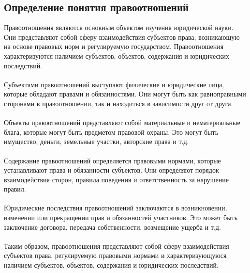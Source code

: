 \documentclass{article}
\begin{document}
\subsection{Определение понятия правоотношений}
Правоотношения являются основным объектом изучения юридической науки. Они представляют собой сферу взаимодействия субъектов права, возникающую на основе правовых норм и регулируемую государством. Правоотношения характеризуются наличием субъектов, объектов, содержания и юридических последствий.\\
~\\
Субъектами правоотношений выступают физические и юридические лица, которые обладают правами и обязанностями. Они могут быть как равноправными сторонами в правоотношении, так и находиться в зависимости друг от друга.\\
~\\
Объекты правоотношений представляют собой материальные и нематериальные блага, которые могут быть предметом правовой охраны. Это могут быть имущество, деньги, земельные участки, авторские права и т.д.\\
~\\
Содержание правоотношений определяется правовыми нормами, которые устанавливают права и обязанности субъектов. Они определяют порядок взаимодействия сторон, правила поведения и ответственность за нарушение правил.\\
~\\
Юридические последствия правоотношений заключаются в возникновении, изменении или прекращении прав и обязанностей участников. Это может быть заключение договора, передача собственности, возмещение ущерба и т.д.\\
~\\
Таким образом, правоотношения представляют собой сферу взаимодействия субъектов права, регулируемую правовыми нормами и характеризующуюся наличием субъектов, объектов, содержания и юридических последствий.
\end{document}
